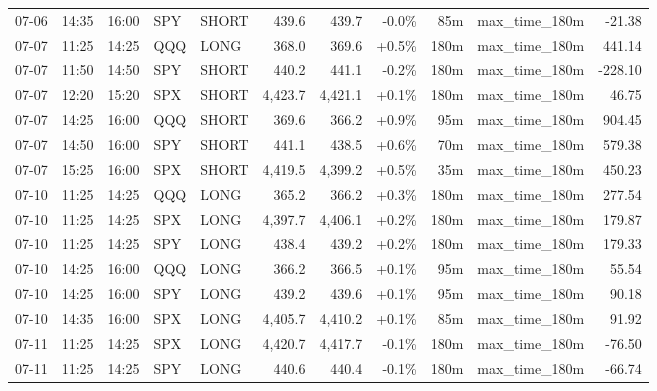 \documentclass[11pt,a4paper,twoside]{article}
\begin{document}
\begin{center}
\begin{longtable}{>{\color{txtmain}}l l l l l r r r r >{\color{txtmain}}l r}
07-06 & 14:35 & 16:00 & SPY & SHORT & 439.6 & 439.7 & \textcolor{lossred}{-0.0\%} & 85m & max\_time\_180m & \textcolor{lossred}{-21.38} \\
07-07 & 11:25 & 14:25 & QQQ & LONG & 368.0 & 369.6 & \textcolor{wingreen}{+0.5\%} & 180m & max\_time\_180m & \textcolor{wingreen}{441.14} \\
07-07 & 11:50 & 14:50 & SPY & SHORT & 440.2 & 441.1 & \textcolor{lossred}{-0.2\%} & 180m & max\_time\_180m & \textcolor{lossred}{-228.10} \\
07-07 & 12:20 & 15:20 & SPX & SHORT & 4,423.7 & 4,421.1 & \textcolor{wingreen}{+0.1\%} & 180m & max\_time\_180m & \textcolor{wingreen}{46.75} \\
07-07 & 14:25 & 16:00 & QQQ & SHORT & 369.6 & 366.2 & \textcolor{wingreen}{+0.9\%} & 95m & max\_time\_180m & \textcolor{wingreen}{904.45} \\
07-07 & 14:50 & 16:00 & SPY & SHORT & 441.1 & 438.5 & \textcolor{wingreen}{+0.6\%} & 70m & max\_time\_180m & \textcolor{wingreen}{579.38} \\
07-07 & 15:25 & 16:00 & SPX & SHORT & 4,419.5 & 4,399.2 & \textcolor{wingreen}{+0.5\%} & 35m & max\_time\_180m & \textcolor{wingreen}{450.23} \\
07-10 & 11:25 & 14:25 & QQQ & LONG & 365.2 & 366.2 & \textcolor{wingreen}{+0.3\%} & 180m & max\_time\_180m & \textcolor{wingreen}{277.54} \\
07-10 & 11:25 & 14:25 & SPX & LONG & 4,397.7 & 4,406.1 & \textcolor{wingreen}{+0.2\%} & 180m & max\_time\_180m & \textcolor{wingreen}{179.87} \\
07-10 & 11:25 & 14:25 & SPY & LONG & 438.4 & 439.2 & \textcolor{wingreen}{+0.2\%} & 180m & max\_time\_180m & \textcolor{wingreen}{179.33} \\
07-10 & 14:25 & 16:00 & QQQ & LONG & 366.2 & 366.5 & \textcolor{wingreen}{+0.1\%} & 95m & max\_time\_180m & \textcolor{wingreen}{55.54} \\
07-10 & 14:25 & 16:00 & SPY & LONG & 439.2 & 439.6 & \textcolor{wingreen}{+0.1\%} & 95m & max\_time\_180m & \textcolor{wingreen}{90.18} \\
07-10 & 14:35 & 16:00 & SPX & LONG & 4,405.7 & 4,410.2 & \textcolor{wingreen}{+0.1\%} & 85m & max\_time\_180m & \textcolor{wingreen}{91.92} \\
07-11 & 11:25 & 14:25 & SPX & LONG & 4,420.7 & 4,417.7 & \textcolor{lossred}{-0.1\%} & 180m & max\_time\_180m & \textcolor{lossred}{-76.50} \\
07-11 & 11:25 & 14:25 & SPY & LONG & 440.6 & 440.4 & \textcolor{lossred}{-0.1\%} & 180m & max\_time\_180m & \textcolor{lossred}{-66.74} \\

\end{longtable}
\end{center}
\end{document}
